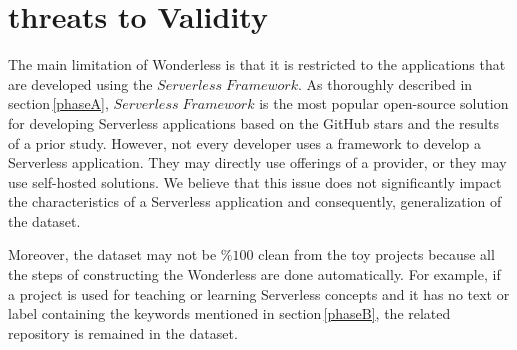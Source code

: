 \section{threats to Validity}
\label{limitations}

The main limitation of Wonderless is that it is restricted to the applications 
that are developed using the $Serverless \; Framework$. As thoroughly 
described in section\,\ref{phaseA}, $Serverless \; Framework$ is the 
most popular open-source solution for developing Serverless applications 
based on the GitHub stars and the results of a prior study\cite{kritikos2018review}. 
However, not every developer uses a framework to develop a Serverless application. 
They may directly use offerings of a provider, or they may use self-hosted solutions. 
We believe that this issue does not significantly impact the characteristics of a 
Serverless application and consequently, generalization of the dataset.

Moreover, the dataset may not be $\%100$ clean from the toy projects 
because all the steps of constructing the Wonderless are done automatically. 
For example, if a project is used for teaching or learning Serverless concepts 
and it has no text or label containing the keywords mentioned in 
section\,\ref{phaseB}, the related repository is remained in the dataset.







